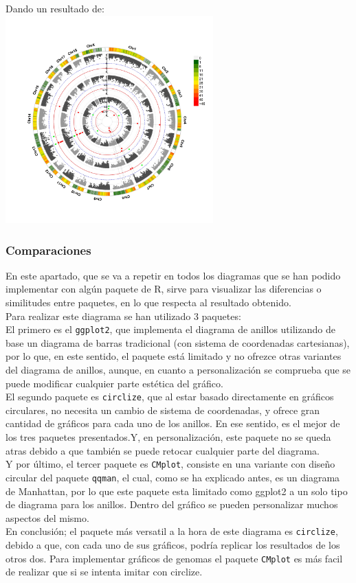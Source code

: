 \documentclass{article}\usepackage[]{graphicx}\usepackage[]{color}
\begin{document}
Dando un resultado de:~\\
\vbox{
    \centering
    \includegraphics[width=0.6\textwidth]{imag/CMplot}
}
\clearpage
\subsubsection{Comparaciones}
En este apartado, que se va a repetir en todos los diagramas que se han podido implementar con alg\'un paquete de R, sirve para visualizar las diferencias o similitudes entre paquetes, en lo que respecta al resultado obtenido.~\\
Para realizar este diagrama se han utilizado 3 paquetes:~\\ 
El primero es el \texttt{ggplot2}, que implementa el diagrama de anillos utilizando de base un diagrama de barras tradicional (con sistema de coordenadas cartesianas), por lo que, en este sentido, el paquete est\'a limitado y no ofrezce otras variantes del diagrama de anillos, aunque, en cuanto a personalizaci\'on se comprueba que se puede modificar cualquier parte est\'etica del gr\'afico.~\\
El segundo paquete es \texttt{circlize}, que al estar basado directamente en gr\'aficos circulares, no necesita un cambio de sistema de coordenadas, y ofrece gran cantidad de gr\'aficos para cada uno de los anillos. En ese sentido, es el mejor de los tres paquetes presentados.Y, en personalizaci\'on, este paquete no se queda atras debido a que tambi\'en se puede retocar cualquier parte del diagrama.~\\
Y por \'ultimo, el tercer paquete es \texttt{CMplot}, consiste en una variante con dise\~no circular del paquete \texttt{qqman}, el cual, como se ha explicado antes, es un diagrama de Manhattan, por lo que este paquete esta limitado como ggplot2 a un solo tipo de diagrama para los anillos. Dentro del gr\'afico se pueden personalizar muchos aspectos del mismo.~\\
En conclusi\'on; el paquete m\'as versatil a la hora de este diagrama es \texttt{circlize}, debido a que, con cada uno de sus gr\'aficos, podr\'ia replicar los resultados de los otros dos. Para implementar gr\'aficos de genomas el paquete \texttt{CMplot} es m\'as facil de realizar que si se intenta imitar con circlize.
\clearpage
\end{document}
